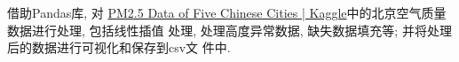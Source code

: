 借助Pandas库, 对
\href{https://www.kaggle.com/datasets/uciml/pm25-data-for-five-chinese-cities}{PM2.5
Data of Five Chinese Cities | Kaggle}中的北京空气质量数据进行处理, 包括线性插值
处理, 处理高度异常数据, 缺失数据填充等; 并将处理后的数据进行可视化和保存到csv文
件中.